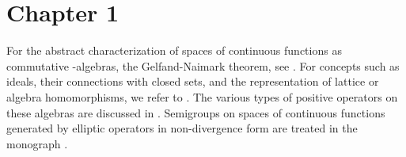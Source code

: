 \setcounter{section}{0}
\notesheadertwo
\thispagestyle{empty}
\section*{Chapter 1}
For the abstract characterization of spaces of continuous functions as commutative \CA-algebras, \ie the Gelfand-Naimark theorem, see \textcite[Chapter I-3]{zbmath01692441}. 
For concepts such as ideals, their connections with closed sets, and the representation of lattice or algebra homomorphisms, we refer to \textcite{zbmath03357434}. 
The various types of positive operators on these algebras are discussed in \textcite[Chapter 4]{zbmath06423122}. 
Semigroups on spaces of continuous functions generated by elliptic
operators in non-divergence form are treated in the monograph
\textcite{zbmath00732330}.
